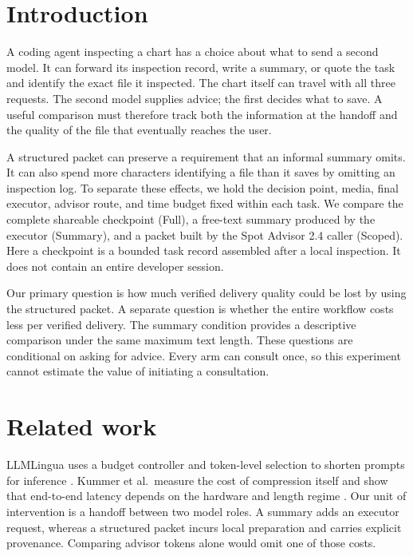 \documentclass[10pt]{article}
\date{November 2026}
\begin{document}
\maketitle
\begin{abstract}

\end{abstract}

\section{Introduction}
A coding agent inspecting a chart has a choice about what to send a second model. It can forward its inspection record, write a summary, or quote the task and identify the exact file it inspected. The chart itself can travel with all three requests. The second model supplies advice; the first decides what to save. A useful comparison must therefore track both the information at the handoff and the quality of the file that eventually reaches the user.

A structured packet can preserve a requirement that an informal summary omits. It can also spend more characters identifying a file than it saves by omitting an inspection log. To separate these effects, we hold the decision point, media, final executor, advisor route, and time budget fixed within each task. We compare the complete shareable checkpoint (Full), a free-text summary produced by the executor (Summary), and a packet built by the Spot Advisor 2.4 caller (Scoped). Here a checkpoint is a bounded task record assembled after a local inspection. It does not contain an entire developer session.

Our primary question is how much verified delivery quality could be lost by using the structured packet. A separate question is whether the entire workflow costs less per verified delivery. The summary condition provides a descriptive comparison under the same maximum text length. These questions are conditional on asking for advice. Every arm can consult once, so this experiment cannot estimate the value of initiating a consultation.

\section{Related work}
LLMLingua uses a budget controller and token-level selection to shorten prompts for inference \cite{llmlingua}. Kummer et al.\ measure the cost of compression itself and show that end-to-end latency depends on the hardware and length regime \cite{kummer}. Our unit of intervention is a handoff between two model roles. A summary adds an executor request, whereas a structured packet incurs local preparation and carries explicit provenance. Comparing advisor tokens alone would omit one of those costs.
\end{document}
